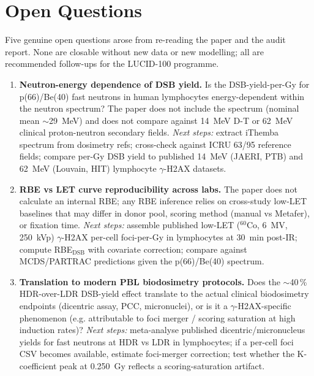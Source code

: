 \section{Open Questions}

Five genuine open questions arose from re-reading the paper and the audit
report. None are closable without new data or new modelling; all are
recommended follow-ups for the LUCID-100 programme.

\begin{enumerate}
  \item \textbf{Neutron-energy dependence of DSB yield.} Is the DSB-yield-per-Gy
        for p(66)/Be(40) fast neutrons in human lymphocytes energy-dependent
        within the neutron spectrum? The paper does not include the spectrum
        (nominal mean $\sim$29~MeV) and does not compare against 14~MeV D-T or
        62~MeV clinical proton-neutron secondary fields.
        \emph{Next steps:} extract iThemba spectrum from dosimetry refs;
        cross-check against ICRU 63/95 reference fields; compare per-Gy DSB
        yield to published 14~MeV (JAERI, PTB) and 62~MeV (Louvain, HIT)
        lymphocyte $\gamma$-H2AX datasets.

  \item \textbf{RBE vs LET curve reproducibility across labs.} The paper does not
        calculate an internal RBE; any RBE inference relies on cross-study
        low-LET baselines that may differ in donor pool, scoring method (manual
        vs Metafer), or fixation time.
        \emph{Next steps:} assemble published low-LET ($^{60}$Co, 6~MV, 250~kVp)
        $\gamma$-H2AX per-cell foci-per-Gy in lymphocytes at 30~min post-IR;
        compute RBE$_{\text{DSB}}$ with covariate correction; compare against
        MCDS/PARTRAC predictions given the p(66)/Be(40) spectrum.

  \item \textbf{Translation to modern PBL biodosimetry protocols.} Does the
        $\sim$40\,\% HDR-over-LDR DSB-yield effect translate to the actual
        clinical biodosimetry endpoints (dicentric assay, PCC, micronuclei),
        or is it a $\gamma$-H2AX-specific phenomenon (e.g. attributable to
        foci merger / scoring saturation at high induction rates)?
        \emph{Next steps:} meta-analyse published dicentric/micronucleus
        yields for fast neutrons at HDR vs LDR in lymphocytes; if a per-cell
        foci CSV becomes available, estimate foci-merger correction; test
        whether the K-coefficient peak at 0.250~Gy reflects a
        scoring-saturation artifact.


\end{enumerate}
